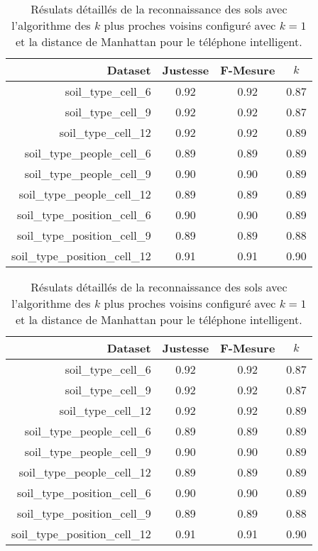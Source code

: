 \begin{table}[H]\renewcommand{\arraystretch}{0.5}
	\centering
	\caption{Résulats détaillés de la reconnaissance des sols avec l'algorithme des $k$ plus proches voisins configuré avec $k=1$ et la distance de Manhattan pour le téléphone intelligent.}
	\label{tab:tab:knn-cell}
	\begin{tabular}{@{}rccc@{}}
		\toprule
			\textbf{Dataset} & \textbf{Justesse} & \textbf{F-Mesure} & \textbf{$k$} \\
		\midrule
			soil\_type\_cell\_6 & 0.92 & 0.92 & 0.87 \\
			soil\_type\_cell\_9 & 0.92 & 0.92 & 0.87 \\
			soil\_type\_cell\_12 & 0.92 & 0.92 & 0.89 \\
			soil\_type\_people\_cell\_6 & 0.89 & 0.89 & 0.89 \\
			soil\_type\_people\_cell\_9 & 0.90 & 0.90 & 0.89 \\
			soil\_type\_people\_cell\_12 & 0.89 & 0.89 & 0.89 \\
			soil\_type\_position\_cell\_6 & 0.90 & 0.90 & 0.89 \\
			soil\_type\_position\_cell\_9 & 0.89 & 0.89 & 0.88 \\
			soil\_type\_position\_cell\_12 & 0.91 & 0.91 & 0.90 \\
		\bottomrule
	\end{tabular}
\end{table}

\begin{table}[H]\renewcommand{\arraystretch}{0.5}
	\centering
	\caption{Résulats détaillés de la reconnaissance des sols avec l'algorithme des $k$ plus proches voisins configuré avec $k=1$ et la distance de Manhattan pour le téléphone intelligent.}
	\label{tab:tab:knn-cell}
	\begin{tabular}{@{}rccc@{}}
		\toprule
			\textbf{Dataset} & \textbf{Justesse} & \textbf{F-Mesure} & \textbf{$k$} \\
		\midrule
			soil\_type\_cell\_6 & 0.92 & 0.92 & 0.87 \\
			soil\_type\_cell\_9 & 0.92 & 0.92 & 0.87 \\
			soil\_type\_cell\_12 & 0.92 & 0.92 & 0.89 \\
			soil\_type\_people\_cell\_6 & 0.89 & 0.89 & 0.89 \\
			soil\_type\_people\_cell\_9 & 0.90 & 0.90 & 0.89 \\
			soil\_type\_people\_cell\_12 & 0.89 & 0.89 & 0.89 \\
			soil\_type\_position\_cell\_6 & 0.90 & 0.90 & 0.89 \\
			soil\_type\_position\_cell\_9 & 0.89 & 0.89 & 0.88 \\
			soil\_type\_position\_cell\_12 & 0.91 & 0.91 & 0.90 \\
		\bottomrule
	\end{tabular}
\end{table}